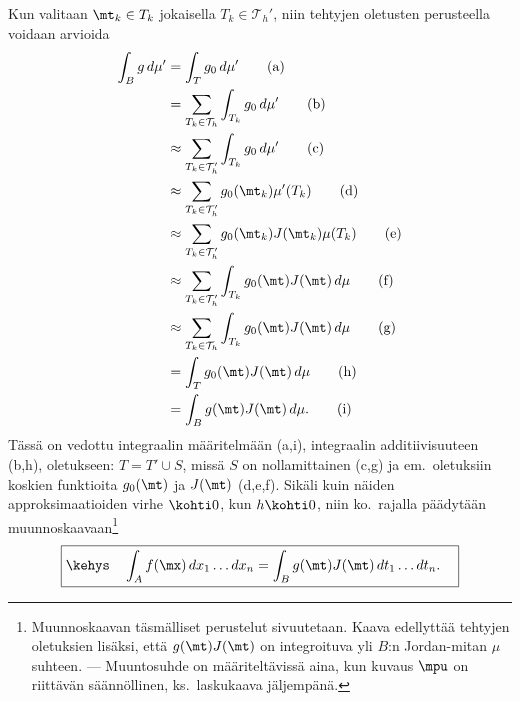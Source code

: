 Kun valitaan $\mt_k \in T_k$ jokaisella $T_k\in\mathcal{T}_h'$, niin tehtyjen oletusten
perusteella voidaan arvioida
\begin{align}
\int_B g\,d\mu' &= \int_T g_0\,d\mu' \tag{a} \\
                &= \sum_{T_k\in\mathcal{T}_h} \int_{T_k} g_0\,d\mu' \tag{b} \\
                &\approx \sum_{T_k\in\mathcal{T}_h'} \int_{T_k} g_0\,d\mu' \tag{c} \\
                &\approx \sum_{T_k\in\mathcal{T}_h'} g_0(\mt_k)\mu'(T_k) \tag{d} \\
                &\approx \sum_{T_k\in\mathcal{T}_h'} g_0(\mt_k)J(\mt_k)\mu(T_k) \tag{e} \\
                &\approx \sum_{T_k\in\mathcal{T}_h'} \int_{T_k} g_0(\mt)J(\mt)\,d\mu \tag{f} \\
                &\approx \sum_{T_k\in\mathcal{T}_h} \int_{T_k} g_0(\mt)J(\mt)\,d\mu \tag{g} \\
                &= \int_T g_0(\mt)J(\mt)\,d\mu \tag{h} \\
                &= \int_B g(\mt)J(\mt)\,d\mu. \tag{i}
\end{align}
Tässä on vedottu integraalin määritelmään (a,i), integraalin additiivisuuteen (b,h),
oletukseen: $T=T' \cup S$, missä $S$ on nollamittainen (c,g) ja em.\ oletuksiin koskien
funktioita $g_0(\mt)$ ja $J(\mt)$ (d,e,f). Sikäli kuin näiden approksimaatioiden virhe
$\kohti 0$, kun $h \kohti 0$, niin ko.\ rajalla päädytään 
muunnoskaavaan\footnote[2]{Muunnoskaavan täsmälliset perustelut sivuutetaan. Kaava edellyttää
tehtyjen oletuksien lisäksi, että $g(\mt)J(\mt)$ on integroituva yli $B$:n Jordan-mitan $\mu$
suhteen. --- Muuntosuhde on määriteltävissä aina, kun kuvaus $\mpu$ on riittävän säännöllinen,
ks.\ laskukaava jäljempänä.}
\begin{equation} \label{muuntokaava}
\boxed{\kehys\quad \int_A f(\mx)\,dx_1\ldots dx_n=\int_B g(\mt)J(\mt)\,dt_1\ldots dt_n. \quad}
\end{equation}